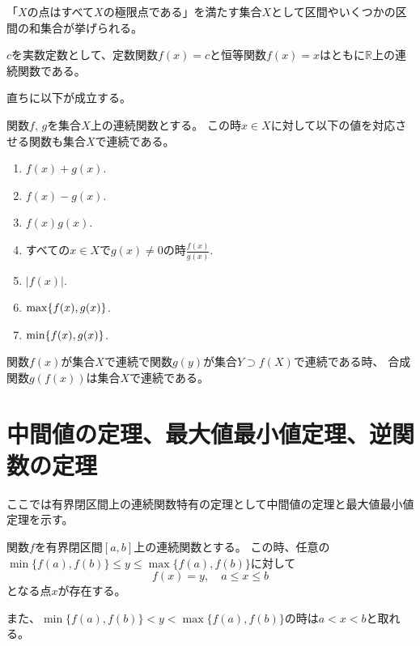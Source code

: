 \begin{remark}
「$X$の点はすべて$X$の極限点である」を満たす集合$X$として区間やいくつかの区間の和集合が挙げられる。
\end{remark}

\begin{example}
\label{t_ex_conti}
$c$を実数定数として、定数関数$f(x) = c$と恒等関数$f(x) = x$はともに$\mathbb{R}$上の連続関数である。
\end{example}

直ちに以下が成立する。

\begin{proposition}[連続関数と演算]
\label{t_conti_arith}
関数$f$, $g$を集合$X$上の連続関数とする。
この時$x \in X$に対して以下の値を対応させる関数も集合$X$で連続である。
\begin{enumerate}
\item
$f(x)+g(x)$.
\item
$f(x)-g(x)$.
\item
$f(x)g(x)$.
\item
すべての$x \in X$で$g(x) \ne 0$の時$\frac{f(x)}{g(x)}$.
\item
$|f(x)|$.
\item
$\max\{ f(x), g(x) \}$.
\item
$\min\{ f(x), g(x) \}$.
\end{enumerate}
\end{proposition}

\begin{proposition}[連続関数の合成]
関数$f(x)$が集合$X$で連続で関数$g(y)$が集合$Y \supset f(X)$で連続である時、
合成関数$g(f(x))$は集合$X$で連続である。
\end{proposition}

\section{中間値の定理、最大値最小値定理、逆関数の定理}

ここでは有界閉区間上の連続関数特有の定理として中間値の定理と最大値最小値定理を示す。

\begin{theorem}[中間値の定理]
関数$f$を有界閉区間$[a, b]$上の連続関数とする。
この時、任意の$\min\{ f(a), f(b) \} \le y \le \max\{ f(a), f(b) \}$に対して
$$
f(x) = y, \quad a \le x \le b
$$
となる点$x$が存在する。

また、$\min\{ f(a), f(b) \} < y < \max\{ f(a), f(b) \}$の時は$a < x < b$と取れる。
\end{theorem}

